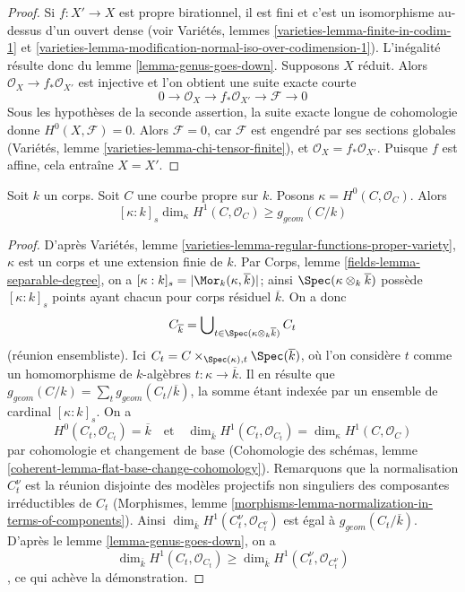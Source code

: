 \begin{proof}
Si $f : X' \to X$ est propre birationnel, il est fini et c'est un isomorphisme au-dessus d'un ouvert dense (voir Variétés, lemmes \ref{varieties-lemma-finite-in-codim-1} et \ref{varieties-lemma-modification-normal-iso-over-codimension-1}). L'inégalité résulte donc du lemme \ref{lemma-genus-goes-down}. Supposons $X$ réduit. Alors $\mathcal{O}_X \to f_*\mathcal{O}_{X'}$ est injective et l'on obtient une suite exacte courte $$
0 \to \mathcal{O}_X \to f_*\mathcal{O}_{X'} \to \mathcal{F} \to 0
$$ Sous les hypothèses de la seconde assertion, la suite exacte longue de cohomologie donne $H^0(X, \mathcal{F}) = 0$. Alors $\mathcal{F} = 0$, car $\mathcal{F}$ est engendré par ses sections globales (Variétés, lemme \ref{varieties-lemma-chi-tensor-finite}), et $\mathcal{O}_X = f_*\mathcal{O}_{X'}$. Puisque $f$ est affine, cela entraîne $X = X'$.
\end{proof}

\begin{lemma}
\label{lemma-bound-geometric-genus-curve}
Soit $k$ un corps. Soit $C$ une courbe propre sur $k$. Posons $\kappa = H^0(C, \mathcal{O}_C)$. Alors
$$
[\kappa : k]_s \dim_\kappa H^1(C, \mathcal{O}_C) \geq g_{geom}(C/k)
$$
\end{lemma}

\begin{proof}
D'après Variétés, lemme \ref{varieties-lemma-regular-functions-proper-variety}, $\kappa$ est un corps et une extension finie de $k$. Par Corps, lemme \ref{fields-lemma-separable-degree}, on a $[\kappa : k]_s = |\Mor_k(\kappa, \overline{k})|$; ainsi $\Spec(\kappa \otimes_k \overline{k})$ possède $[\kappa : k]_s$ points ayant chacun pour corps résiduel $\overline{k}$. On a donc $$
C_{\overline{k}} =
\bigcup\nolimits_{t \in \Spec(\kappa \otimes_k \overline{k})} C_t
$$ (réunion ensembliste). Ici $C_t = C \times_{\Spec(\kappa), t} \Spec(\overline{k})$, où l'on considère $t$ comme un homomorphisme de $k$-algèbres $t : \kappa \to \overline{k}$. Il en résulte que $g_{geom}(C/k) = \sum_t g_{geom}(C_t/\overline{k})$, la somme étant indexée par un ensemble de cardinal $[\kappa : k]_s$. On a $$
H^0(C_t, \mathcal{O}_{C_t}) = \overline{k}
\quad\text{et}\quad
\dim_{\overline{k}} H^1(C_t, \mathcal{O}_{C_t}) =
\dim_\kappa H^1(C, \mathcal{O}_C)
$$ par cohomologie et changement de base (Cohomologie des schémas, lemme \ref{coherent-lemma-flat-base-change-cohomology}). Remarquons que la normalisation $C_t^\nu$ est la réunion disjointe des modèles projectifs non singuliers des composantes irréductibles de $C_t$ (Morphismes, lemme \ref{morphisms-lemma-normalization-in-terms-of-components}). Ainsi $\dim_{\overline{k}} H^1(C_t^\nu, \mathcal{O}_{C_t^\nu})$ est égal à $g_{geom}(C_t/\overline{k})$. D'après le lemme \ref{lemma-genus-goes-down}, on a $$
\dim_{\overline{k}} H^1(C_t, \mathcal{O}_{C_t}) \geq
\dim_{\overline{k}} H^1(C_t^\nu, \mathcal{O}_{C_t^\nu})
$$, ce qui achève la démonstration.
\end{proof}

